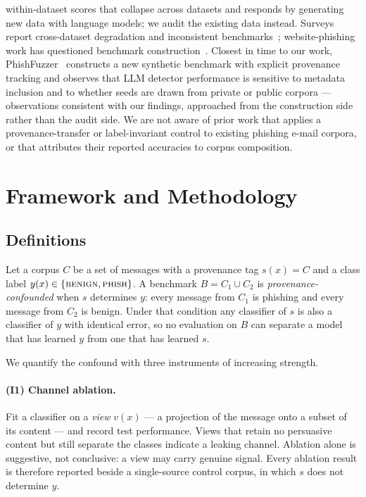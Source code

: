 \documentclass[twoside,11pt]{article}
\begin{document}
within-dataset scores that collapse across datasets and responds by generating
new data with language models; we audit the existing data instead.
Surveys report cross-dataset degradation and inconsistent
benchmarks~\citep{indepth2025,meajor2025}; website-phishing work has questioned
benchmark construction~\citep{website2020}. Closest in time to our work,
PhishFuzzer~\citep{phishfuzzer2026} constructs a new synthetic benchmark with
explicit provenance tracking and observes that LLM detector performance is
sensitive to metadata inclusion and to whether seeds are drawn from private or
public corpora --- observations consistent with our findings, approached from
the construction side rather than the audit side. We are not aware of prior
work that applies a provenance-transfer or label-invariant control to existing
phishing e-mail corpora, or that attributes their reported accuracies to
corpus composition.

\section{Framework and Methodology}
\label{sec:method}

\subsection{Definitions}

Let a corpus $C$ be a set of messages with a provenance tag $s(x)=C$ and a
class label $y(x)\in\{\textsc{benign},\textsc{phish}\}$. A benchmark
$B=C_1\cup C_2$ is \emph{provenance-confounded} when $s$ determines $y$:
every message from $C_1$ is phishing and every message from $C_2$ is benign.
Under that condition any classifier of $s$ is also a classifier of $y$ with
identical error, so no evaluation on $B$ can separate a model that has learned
$y$ from one that has learned $s$.

We quantify the confound with three instruments of increasing strength.

\paragraph{(I1) Channel ablation.}
Fit a classifier on a \emph{view} $v(x)$ --- a projection of the message onto
a subset of its content --- and record test performance. Views that retain no
persuasive content but still separate the classes indicate a leaking channel.
Ablation alone is suggestive, not conclusive: a view may carry genuine signal.
Every ablation result is therefore reported beside a single-source control
corpus, in which $s$ does not determine $y$.
\end{document}
